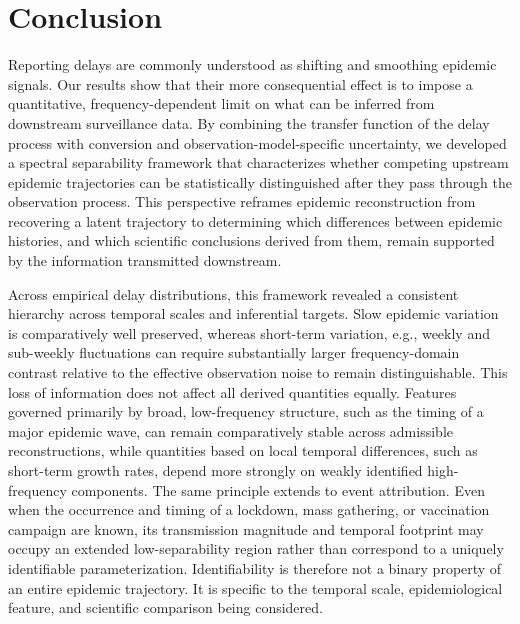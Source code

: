 \section*{Conclusion}

Reporting delays are commonly understood as shifting and smoothing epidemic signals. Our results show that their more consequential effect is to impose a quantitative, frequency-dependent limit on what can be inferred from downstream surveillance data. By combining the transfer function of the delay process with conversion and observation-model-specific uncertainty, we developed a spectral separability framework that characterizes whether competing upstream epidemic trajectories can be statistically distinguished after they pass through the observation process. This perspective reframes epidemic reconstruction from recovering a latent trajectory to determining which differences between epidemic histories, and which scientific conclusions derived from them, remain supported by the information transmitted downstream.

Across empirical delay distributions, this framework revealed a consistent hierarchy across temporal scales and inferential targets. Slow epidemic variation is comparatively well preserved, whereas short-term variation, e.g., weekly and sub-weekly fluctuations can require substantially larger frequency-domain contrast relative to the effective observation noise to remain distinguishable. This loss of information does not affect all derived quantities equally. Features governed primarily by broad, low-frequency structure, such as the timing of a major epidemic wave, can remain comparatively stable across admissible reconstructions, while quantities based on local temporal differences, such as short-term growth rates, depend more strongly on weakly identified high-frequency components. The same principle extends to event attribution. Even when the occurrence and timing of a lockdown, mass gathering, or vaccination campaign are known, its transmission magnitude and temporal footprint may occupy an extended low-separability region rather than correspond to a uniquely identifiable parameterization. Identifiability is therefore not a binary property of an entire epidemic trajectory. It is specific to the temporal scale, epidemiological feature, and scientific comparison being considered.

